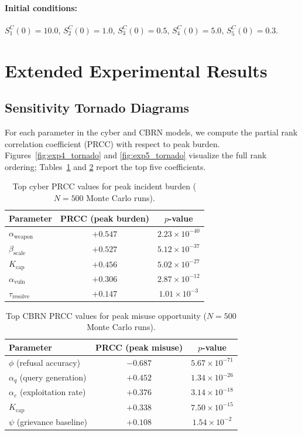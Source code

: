\documentclass[11pt]{article}
\begin{document}
\paragraph{Initial conditions:} $S_1^C(0) = 10.0$, $S_2^C(0) = 1.0$, $S_3^C(0) = 0.5$, $S_4^C(0) = 5.0$, $S_5^C(0) = 0.3$.

\section{Extended Experimental Results}
\label{app:extended}

\subsection{Sensitivity Tornado Diagrams}
\label{app:tornado}

For each parameter in the cyber and CBRN models, we compute the partial rank correlation coefficient (PRCC) with respect to peak burden. Figures~\ref{fig:exp4_tornado} and \ref{fig:exp5_tornado} visualize the full rank ordering; Tables~\ref{tab:prcc_cyber} and \ref{tab:prcc_cbrn} report the top five coefficients.

\begin{table}[H]
\centering
\caption{Top cyber PRCC values for peak incident burden ($N = 500$ Monte Carlo runs).}
\label{tab:prcc_cyber}
\small
\begin{tabular}{@{}lcc@{}}
\toprule
\textbf{Parameter} & \textbf{PRCC (peak burden)} & \textbf{$p$-value} \\
\midrule
$\alpha_{\text{weapon}}$ & $+0.547$ & $2.23 \times 10^{-40}$ \\
$\beta_{\text{scale}}$ & $+0.527$ & $5.12 \times 10^{-37}$ \\
$K_{\text{cap}}$ & $+0.456$ & $5.02 \times 10^{-27}$ \\
$\alpha_{\text{vuln}}$ & $+0.306$ & $2.87 \times 10^{-12}$ \\
$\tau_{\text{resolve}}$ & $+0.147$ & $1.01 \times 10^{-3}$ \\
\bottomrule
\end{tabular}
\end{table}

\begin{table}[H]
\centering
\caption{Top CBRN PRCC values for peak misuse opportunity ($N = 500$ Monte Carlo runs).}
\label{tab:prcc_cbrn}
\small
\begin{tabular}{@{}lcc@{}}
\toprule
\textbf{Parameter} & \textbf{PRCC (peak misuse)} & \textbf{$p$-value} \\
\midrule
$\phi$ (refusal accuracy) & $-0.687$ & $5.67 \times 10^{-71}$ \\
$\alpha_q$ (query generation) & $+0.452$ & $1.34 \times 10^{-26}$ \\
$\alpha_e$ (exploitation rate) & $+0.376$ & $3.14 \times 10^{-18}$ \\
$K_{\text{cap}}$ & $+0.338$ & $7.50 \times 10^{-15}$ \\
$\psi$ (grievance baseline) & $+0.108$ & $1.54 \times 10^{-2}$ \\
\bottomrule
\end{tabular}
\end{table}
\end{document}
